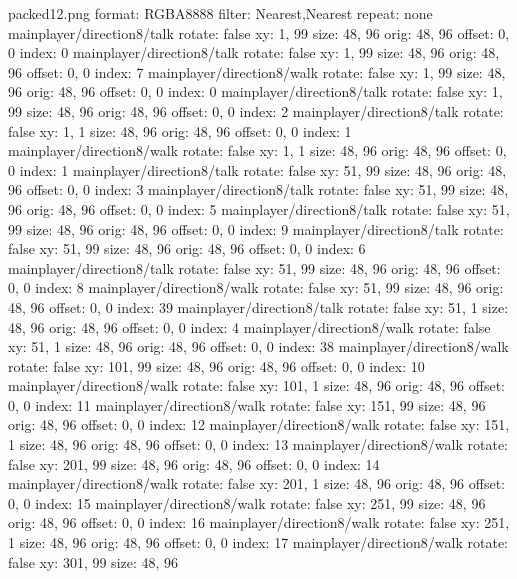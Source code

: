 packed12.png
format: RGBA8888
filter: Nearest,Nearest
repeat: none
mainplayer/direction8/talk
  rotate: false
  xy: 1, 99
  size: 48, 96
  orig: 48, 96
  offset: 0, 0
  index: 0
mainplayer/direction8/talk
  rotate: false
  xy: 1, 99
  size: 48, 96
  orig: 48, 96
  offset: 0, 0
  index: 7
mainplayer/direction8/walk
  rotate: false
  xy: 1, 99
  size: 48, 96
  orig: 48, 96
  offset: 0, 0
  index: 0
mainplayer/direction8/talk
  rotate: false
  xy: 1, 99
  size: 48, 96
  orig: 48, 96
  offset: 0, 0
  index: 2
mainplayer/direction8/talk
  rotate: false
  xy: 1, 1
  size: 48, 96
  orig: 48, 96
  offset: 0, 0
  index: 1
mainplayer/direction8/walk
  rotate: false
  xy: 1, 1
  size: 48, 96
  orig: 48, 96
  offset: 0, 0
  index: 1
mainplayer/direction8/talk
  rotate: false
  xy: 51, 99
  size: 48, 96
  orig: 48, 96
  offset: 0, 0
  index: 3
mainplayer/direction8/talk
  rotate: false
  xy: 51, 99
  size: 48, 96
  orig: 48, 96
  offset: 0, 0
  index: 5
mainplayer/direction8/talk
  rotate: false
  xy: 51, 99
  size: 48, 96
  orig: 48, 96
  offset: 0, 0
  index: 9
mainplayer/direction8/talk
  rotate: false
  xy: 51, 99
  size: 48, 96
  orig: 48, 96
  offset: 0, 0
  index: 6
mainplayer/direction8/talk
  rotate: false
  xy: 51, 99
  size: 48, 96
  orig: 48, 96
  offset: 0, 0
  index: 8
mainplayer/direction8/walk
  rotate: false
  xy: 51, 99
  size: 48, 96
  orig: 48, 96
  offset: 0, 0
  index: 39
mainplayer/direction8/talk
  rotate: false
  xy: 51, 1
  size: 48, 96
  orig: 48, 96
  offset: 0, 0
  index: 4
mainplayer/direction8/walk
  rotate: false
  xy: 51, 1
  size: 48, 96
  orig: 48, 96
  offset: 0, 0
  index: 38
mainplayer/direction8/walk
  rotate: false
  xy: 101, 99
  size: 48, 96
  orig: 48, 96
  offset: 0, 0
  index: 10
mainplayer/direction8/walk
  rotate: false
  xy: 101, 1
  size: 48, 96
  orig: 48, 96
  offset: 0, 0
  index: 11
mainplayer/direction8/walk
  rotate: false
  xy: 151, 99
  size: 48, 96
  orig: 48, 96
  offset: 0, 0
  index: 12
mainplayer/direction8/walk
  rotate: false
  xy: 151, 1
  size: 48, 96
  orig: 48, 96
  offset: 0, 0
  index: 13
mainplayer/direction8/walk
  rotate: false
  xy: 201, 99
  size: 48, 96
  orig: 48, 96
  offset: 0, 0
  index: 14
mainplayer/direction8/walk
  rotate: false
  xy: 201, 1
  size: 48, 96
  orig: 48, 96
  offset: 0, 0
  index: 15
mainplayer/direction8/walk
  rotate: false
  xy: 251, 99
  size: 48, 96
  orig: 48, 96
  offset: 0, 0
  index: 16
mainplayer/direction8/walk
  rotate: false
  xy: 251, 1
  size: 48, 96
  orig: 48, 96
  offset: 0, 0
  index: 17
mainplayer/direction8/walk
  rotate: false
  xy: 301, 99
  size: 48, 96
